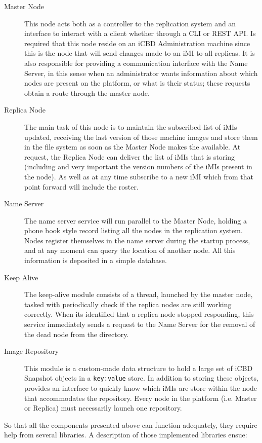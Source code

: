 \begin{description}
	\item [Master Node] This node acts both as a controller to the replication system and an interface to interact with a client whether through a CLI or REST API. Is required that this node reside on an iCBD Administration machine since this is the node that will send changes made to an iMI to all replicas. It is also responsible for providing a communication interface with the Name Server, in this sense when an administrator wants information about which nodes are present on the platform, or what is their status; these requests obtain a route through the master node.
	\item [Replica Node] The main task of this node is to maintain the subscribed list of iMIs updated, receiving the last version of those machine images and store them in the file system as soon as the Master Node makes the available. At request, the Replica Node can deliver the list of iMIs that is storing (including and very important the version numbers of the iMIs present in the node). As well as at any time subscribe to a new iMI which from that point forward will include the roster.
	\item [Name Server] The name server service will run parallel to the Master Node, holding a phone book style record listing all the nodes in the replication system. Nodes register themselves in the name server during the startup process, and at any moment can query the location of another node. All this information is deposited in a simple database.
	\item [Keep Alive] The keep-alive module consists of a thread, launched by the master node, tasked with periodically check if the replica nodes are still working correctly. When its identified that a replica node stopped responding, this service immediately sends a request to the Name Server for the removal of the dead node from the directory.
	\item [Image Repository] This module is a custom-made data structure to hold a large set of iCBD Snapshot objects in a \texttt{key:value} store. In addition to storing these objects, provides an interface to quickly know which iMIs are store within the node that accommodates the repository. Every node in the platform (i.e. Master or Replica) must necessarily launch one repository.
\end{description}


So that all the components presented above can function adequately, they require help from several libraries. A description of those implemented libraries ensue:

